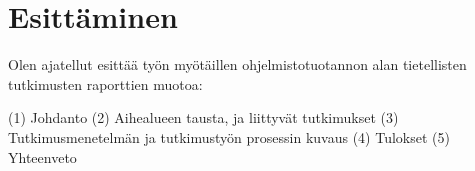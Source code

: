 \documentclass[12pt,a4paper,finnish,oneside]{article}
\begin{document}
\section{Esittäminen}

Olen ajatellut esittää työn myötäillen ohjelmistotuotannon alan tietellisten
tutkimusten raporttien muotoa:

(1) Johdanto
(2) Aihealueen tausta, ja liittyvät tutkimukset
(3) Tutkimusmenetelmän ja tutkimustyön prosessin kuvaus
(4) Tulokset
(5) Yhteenveto


%



% 

\renewcommand{\refname}{Lähteet}  %



\end{document}
